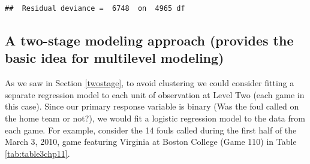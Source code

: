 \documentclass[
]{krantz}
\begin{document}
\begin{verbatim}
##  Residual deviance =  6748  on  4965 df
\end{verbatim}

\hypertarget{twostage-glmm}{%
\subsection{A two-stage modeling approach (provides the basic idea for multilevel modeling)}\label{twostage-glmm}}

As we saw in Section \ref{twostage}, to avoid clustering we could consider fitting a separate regression model to each unit of observation at Level Two (each game in this case). Since our primary response variable is binary (Was the foul called on the home team or not?), we would fit a logistic regression model to the data from each game. For example, consider the 14 fouls called during the first half of the March 3, 2010, game featuring Virginia at Boston College (Game 110) in Table \ref{tab:table3chp11}.

\begin{table}

\caption{\label{tab:table3chp11}Key variables from the March 3, 2010, game featuring Virginia at Boston College (Game 110).}
\centering
{}
\end{table}
\end{document}
